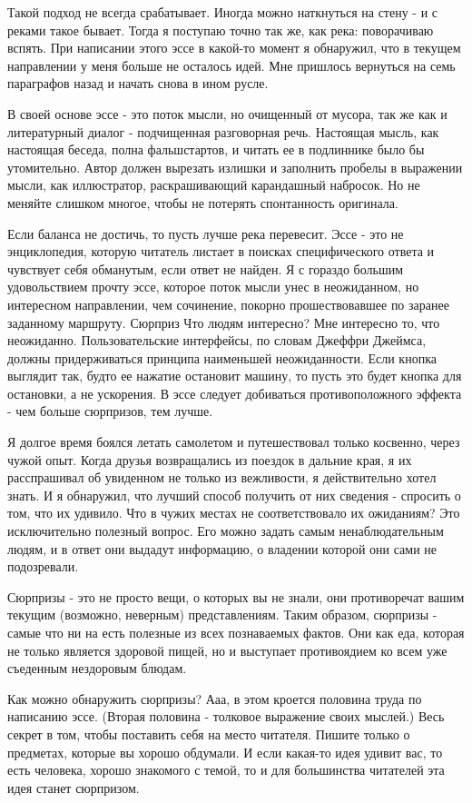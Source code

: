 \documentclass[ebook,12pt,oneside,openany]{memoir}
\begin{document}
Такой подход не всегда срабатывает. Иногда можно наткнуться на стену -
и с реками такое бывает. Тогда я поступаю точно так же, как река:
поворачиваю вспять. При написании этого эссе в какой-то момент я
обнаружил, что в текущем направлении у меня больше не осталось идей.
Мне пришлось вернуться на семь параграфов назад и начать снова в ином
русле.

В своей основе эссе - это поток мысли, но очищенный от мусора, так же
как и литературный диалог - подчищенная разговорная речь. Настоящая
мысль, как настоящая беседа, полна фальшстартов, и читать ее в
подлиннике было бы утомительно. Автор должен вырезать излишки и
заполнить пробелы в выражении мысли, как иллюстратор, раскрашивающий
карандашный набросок. Но не меняйте слишком многое, чтобы не потерять
спонтанность оригинала.

Если баланса не достичь, то пусть лучше река перевесит. Эссе - это не
энциклопедия, которую читатель листает в поисках специфического ответа
и чувствует себя обманутым, если ответ не найден. Я с гораздо большим
удовольствием прочту эссе, которое поток мысли унес в неожиданном, но
интересном направлении, чем сочинение, покорно прошествовавшее по
заранее заданному маршруту. Сюрприз Что людям интересно? Мне интересно
то, что неожиданно. Пользовательские интерфейсы, по словам Джеффри
Джеймса, должны придерживаться принципа наименьшей неожиданности. Если
кнопка выглядит так, будто ее нажатие остановит машину, то пусть это
будет кнопка для остановки, а не ускорения. В эссе следует добиваться
противоположного эффекта - чем больше сюрпризов, тем лучше.

Я долгое время боялся летать самолетом и путешествовал только
косвенно, через чужой опыт. Когда друзья возвращались из поездок в
дальние края, я их расспрашивал об увиденном не только из вежливости,
я действительно хотел знать. И я обнаружил, что лучший способ получить
от них сведения - спросить о том, что их удивило. Что в чужих местах
не соответствовало их ожиданиям? Это исключительно полезный вопрос.
Его можно задать самым ненаблюдательным людям, и в ответ они выдадут
информацию, о владении которой они сами не подозревали.

Сюрпризы - это не просто вещи, о которых вы не знали, они противоречат
вашим текущим (возможно, неверным) представлениям. Таким образом,
сюрпризы - самые что ни на есть полезные из всех познаваемых фактов.
Они как еда, которая не только является здоровой пищей, но и выступает
противоядием ко всем уже съеденным нездоровым блюдам.

Как можно обнаружить сюрпризы? Ааа, в этом кроется половина труда по
написанию эссе. (Вторая половина - толковое выражение своих мыслей.)
Весь секрет в том, чтобы поставить себя на место читателя. Пишите
только о предметах, которые вы хорошо обдумали. И если какая-то идея
удивит вас, то есть человека, хорошо знакомого с темой, то и для
большинства читателей эта идея станет сюрпризом.
\end{document}
